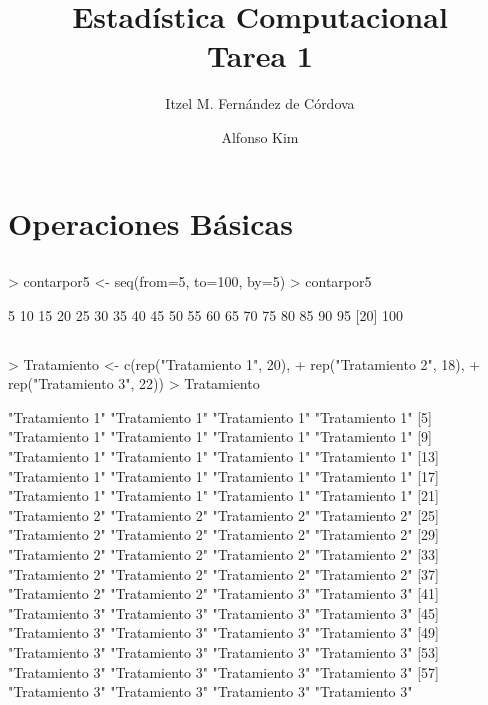 \documentclass[letterpaper]{report}
\begin{document}
\title{Estad\'istica Computacional \\
Tarea 1}
\author{ Itzel M. Fern\'andez de C\'ordova \and Alfonso Kim }
\makeatother

\maketitle



\section{Operaciones B\'asicas}

\subsection{}
\begin{Schunk}
\begin{Sinput}
> contarpor5 <- seq(from=5, to=100, by=5)
> contarpor5
\end{Sinput}
\begin{Soutput}
 [1]   5  10  15  20  25  30  35  40  45  50  55  60  65  70  75  80  85  90  95
[20] 100
\end{Soutput}
\end{Schunk}

\subsection{}
\begin{Schunk}
\begin{Sinput}
> Tratamiento <- c(rep("Tratamiento 1", 20), 
+                  rep("Tratamiento 2", 18), 
+                  rep("Tratamiento 3", 22))
> Tratamiento
\end{Sinput}
\begin{Soutput}
 [1] "Tratamiento 1" "Tratamiento 1" "Tratamiento 1" "Tratamiento 1"
 [5] "Tratamiento 1" "Tratamiento 1" "Tratamiento 1" "Tratamiento 1"
 [9] "Tratamiento 1" "Tratamiento 1" "Tratamiento 1" "Tratamiento 1"
[13] "Tratamiento 1" "Tratamiento 1" "Tratamiento 1" "Tratamiento 1"
[17] "Tratamiento 1" "Tratamiento 1" "Tratamiento 1" "Tratamiento 1"
[21] "Tratamiento 2" "Tratamiento 2" "Tratamiento 2" "Tratamiento 2"
[25] "Tratamiento 2" "Tratamiento 2" "Tratamiento 2" "Tratamiento 2"
[29] "Tratamiento 2" "Tratamiento 2" "Tratamiento 2" "Tratamiento 2"
[33] "Tratamiento 2" "Tratamiento 2" "Tratamiento 2" "Tratamiento 2"
[37] "Tratamiento 2" "Tratamiento 2" "Tratamiento 3" "Tratamiento 3"
[41] "Tratamiento 3" "Tratamiento 3" "Tratamiento 3" "Tratamiento 3"
[45] "Tratamiento 3" "Tratamiento 3" "Tratamiento 3" "Tratamiento 3"
[49] "Tratamiento 3" "Tratamiento 3" "Tratamiento 3" "Tratamiento 3"
[53] "Tratamiento 3" "Tratamiento 3" "Tratamiento 3" "Tratamiento 3"
[57] "Tratamiento 3" "Tratamiento 3" "Tratamiento 3" "Tratamiento 3"
\end{Soutput}
\end{Schunk}
\end{document}
